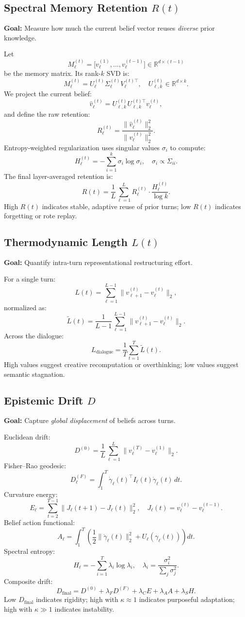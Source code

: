 \documentclass[11pt]{article}
\begin{document}
\subsection{Spectral Memory Retention $R(t)$}

\textbf{Goal:} Measure how much the current belief vector reuses \emph{diverse} prior knowledge.

Let
\[
M_\ell^{(t)} = \big[v_\ell^{(1)}, \dots, v_\ell^{(t-1)}\big] \in \mathbb{R}^{d\times (t-1)}
\]
be the memory matrix. Its rank-$k$ SVD is:
\[
M_\ell^{(t)} = U_\ell^{(t)} \Sigma_\ell^{(t)} V_\ell^{(t)\top}, \quad U_{\ell,k}^{(t)} \in \mathbb{R}^{d\times k}.
\]
We project the current belief:
\[
\hat{v}_\ell^{(t)} = U_{\ell,k}^{(t)} U_{\ell,k}^{(t)\top} v_\ell^{(t)},
\]
and define the raw retention:
\[
R_\ell^{(t)} = \frac{\|\hat{v}_\ell^{(t)}\|_2^2}{\|v_\ell^{(t)}\|_2^2}.
\]
Entropy-weighted regularization uses singular values $\sigma_i$ to compute:
\[
H_\ell^{(t)} = -\sum_{i=1}^k \sigma_i \log \sigma_i, \quad \sigma_i \propto \Sigma_{ii}.
\]
The final layer-averaged retention is:
\[
R(t) = \frac{1}{L} \sum_{\ell=1}^L R_\ell^{(t)} \cdot \frac{H_\ell^{(t)}}{\log k}.
\]
High $R(t)$ indicates stable, adaptive reuse of prior turns; low $R(t)$ indicates forgetting or rote replay.

\subsection{Thermodynamic Length $L(t)$}

\textbf{Goal:} Quantify intra-turn representational restructuring effort.

For a single turn:
\[
L(t) = \sum_{\ell=1}^{L-1} \| v_{\ell+1}^{(t)} - v_\ell^{(t)} \|_2,
\]
normalized as:
\[
\tilde{L}(t) = \frac{1}{L-1} \sum_{\ell=1}^{L-1} \| v_{\ell+1}^{(t)} - v_\ell^{(t)} \|_2.
\]
Across the dialogue:
\[
L_{\text{dialogue}} = \frac{1}{T} \sum_{t=1}^T \tilde{L}(t).
\]
High values suggest creative recomputation or overthinking; low values suggest semantic stagnation.

\subsection{Epistemic Drift $D$}

\textbf{Goal:} Capture \emph{global displacement} of beliefs across turns.

Euclidean drift:
\[
D^{(0)} = \frac{1}{L} \sum_{\ell=1}^L \| v_\ell^{(T)} - v_\ell^{(1)} \|_2.
\]
Fisher--Rao geodesic:
\[
D_\ell^{(F)} = \int_{1}^T \dot{\gamma}_\ell(t)^\top I_\ell(t) \dot{\gamma}_\ell(t)\,dt.
\]
Curvature energy:
\[
E_\ell = \sum_{t=2}^{T-1} \| J_\ell(t+1) - J_\ell(t) \|_2^2, \quad J_\ell(t) = v_\ell^{(t)} - v_\ell^{(t-1)}.
\]
Belief action functional:
\[
A_\ell = \int_{1}^T \left( \frac12\|\dot{\gamma}_\ell(t)\|_2^2 + U_\ell(\gamma_\ell(t)) \right) dt.
\]
Spectral entropy:
\[
H_\ell = -\sum_{i=1}^T \lambda_i \log \lambda_i, \quad \lambda_i = \frac{\sigma_i^2}{\sum_j \sigma_j^2}.
\]
Composite drift:
\[
D_{\text{final}} = D^{(0)} + \lambda_F D^{(F)} + \lambda_C E + \lambda_A A + \lambda_S H.
\]
Low $D_{\text{final}}$ indicates rigidity; high with $\kappa\approx 1$ indicates purposeful adaptation; high with $\kappa \gg 1$ indicates instability.
\end{document}
